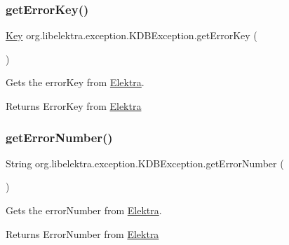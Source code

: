 \subsubsection{\texorpdfstring{get\+Error\+Key()}{getErrorKey()}}
{\footnotesize\ttfamily \hyperlink{classorg_1_1libelektra_1_1Key}{Key} org.\+libelektra.\+exception.\+K\+D\+B\+Exception.\+get\+Error\+Key (\begin{DoxyParamCaption}{ }\end{DoxyParamCaption})\hspace{0.3cm}{\ttfamily [inline]}}



Gets the error\+Key from \hyperlink{interfaceorg_1_1libelektra_1_1Elektra}{Elektra}. 

\begin{DoxyReturn}{Returns}
Error\+Key from \hyperlink{interfaceorg_1_1libelektra_1_1Elektra}{Elektra} 
\end{DoxyReturn}
\mbox{\label{classorg_1_1libelektra_1_1exception_1_1KDBException_a3d07f27121a4870471ea6927d93c04a9}} 
\subsubsection{\texorpdfstring{get\+Error\+Number()}{getErrorNumber()}}
{\footnotesize\ttfamily String org.\+libelektra.\+exception.\+K\+D\+B\+Exception.\+get\+Error\+Number (\begin{DoxyParamCaption}{ }\end{DoxyParamCaption})\hspace{0.3cm}{\ttfamily [inline]}}



Gets the error\+Number from \hyperlink{interfaceorg_1_1libelektra_1_1Elektra}{Elektra}. 

\begin{DoxyReturn}{Returns}
Error\+Number from \hyperlink{interfaceorg_1_1libelektra_1_1Elektra}{Elektra} 
\end{DoxyReturn}
\mbox{\label{classorg_1_1libelektra_1_1exception_1_1KDBException_a80c8598787cff127a83290c87450dde0}} 
